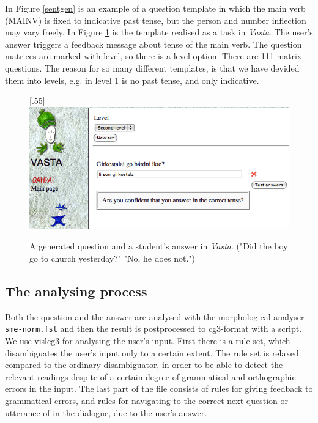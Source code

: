 \documentclass[11pt]{article}
\begin{document}
In Figure \ref{sentgen} is an example of a question template in which the main verb (MAINV) is fixed to indicative past tense, but the person and number inflection may vary freely. In Figure \ref{vastasent} is the template realised as a task in \textit{Vasta}. The user's answer triggers a feedback message about tense of the main verb. The question matrices are marked with level, so there is a level option. There are 111 matrix questions. The reason for so many different templates, is that we have devided them into levels, e.g. in level 1 is no past tense, and only indicative.

\begin{figure}[htbp]
\begin{center}
\scalebox{.55}[.55]{\includegraphics{presentation/img/Vasta_sentencegen_example.png}}\\
\caption{A generated question and a student's answer in \textit{Vasta}. ("Did the boy go to church yesterday?" "No, he does not.")}
\label{vastasent}
\end{center}
\end{figure}
 
\subsection{The analysing process} 
Both the question and the answer are analysed with the morphological analyser \texttt{sme-norm.fst} and then the result is postprocessed to cg3-format with a script.
We use vislcg3 for analysing the user's input. First there is a rule set, which disambiguates the user's input only to a certain extent. The rule set is relaxed compared to the ordinary disambiguator, in order to be able to detect the relevant readings despite of a certain degree of grammatical and orthographic errors in the input. The last part of the file consists of rules for giving feedback to grammatical errors, and rules for navigating to the correct next question or utterance of in the dialogue, due to the user's answer.  
\end{document}
